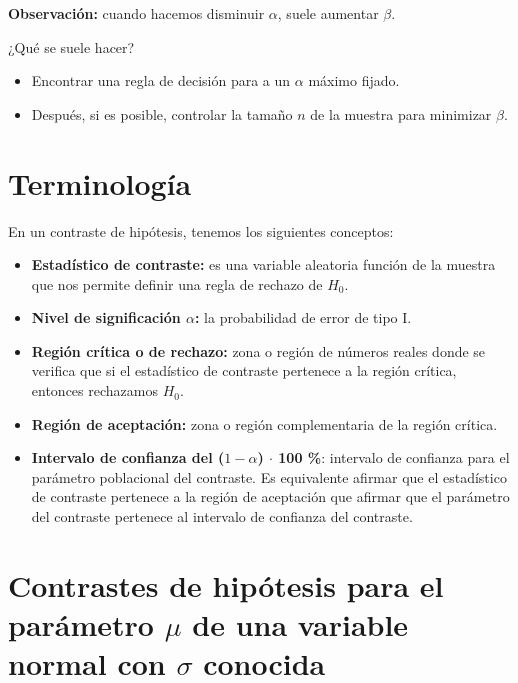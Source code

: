 \documentclass[
]{article}
\providecommand{\tightlist}{%
  \setlength{\itemsep}{0pt}\setlength{\parskip}{0pt}}
\begin{document}
\textbf{Observación:} cuando hacemos disminuir \(\alpha\), suele
aumentar \(\beta\).

¿Qué se suele hacer?

\begin{itemize}
\tightlist
\item
  Encontrar una regla de decisión para a un \(\alpha\) máximo fijado.
\item
  Después, si es posible, controlar la tamaño \(n\) de la muestra para
  minimizar \(\beta\).
\end{itemize}

\hypertarget{terminologuxeda}{%
\section{Terminología}\label{terminologuxeda}}

En un contraste de hipótesis, tenemos los siguientes conceptos:

\begin{itemize}
\tightlist
\item
  \textbf{Estadístico de contraste:} es una variable aleatoria función
  de la muestra que nos permite definir una regla de rechazo de \(H_0\).
\item
  \textbf{Nivel de significación \(\alpha\):} la probabilidad de error
  de tipo I.
\item
  \textbf{Región crítica o de rechazo:} zona o región de números reales
  donde se verifica que si el estadístico de contraste pertenece a la
  región crítica, entonces rechazamos \(H_0\).
\item
  \textbf{Región de aceptación:} zona o región complementaria de la
  región crítica.
\item
  \textbf{Intervalo de confianza del (\(1-\alpha\)) \(\cdot\) 100 \%}:
  intervalo de confianza para el parámetro poblacional del contraste. Es
  equivalente afirmar que el estadístico de contraste pertenece a la
  región de aceptación que afirmar que el parámetro del contraste
  pertenece al intervalo de confianza del contraste.
\end{itemize}

\hypertarget{contrastes-de-hipuxf3tesis-para-el-paruxe1metro-mu-de-una-variable-normal-con-sigma-conocida}{%
\section{\texorpdfstring{Contrastes de hipótesis para el parámetro
\(\mu\) de una variable normal con \(\sigma\)
conocida}{Contrastes de hipótesis para el parámetro \textbackslash mu de una variable normal con \textbackslash sigma conocida}}\label{contrastes-de-hipuxf3tesis-para-el-paruxe1metro-mu-de-una-variable-normal-con-sigma-conocida}}
\end{document}
